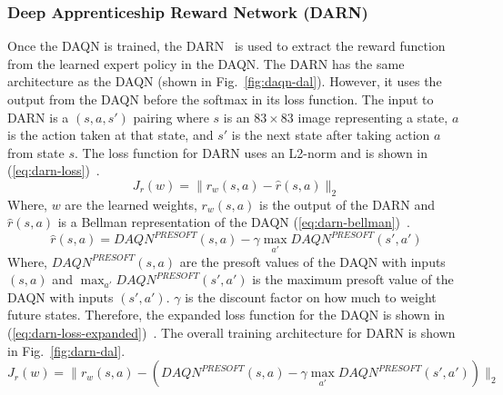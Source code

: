 \documentclass[12pt,american]{report}
\begin{document}
\subsubsection{Deep Apprenticeship Reward Network (DARN)}
Once the DAQN is trained, the DARN~\cite{markovikj2014deep} is used to extract the reward function from the learned expert policy in the DAQN.  The DARN has the same architecture as the DAQN (shown in Fig.~\ref{fig:daqn-dal}). However, it uses the output from the DAQN before the softmax in its loss function.  The input to DARN is a $(s,a,s')$ pairing where $s$ is an $83\times 83$ image representing a state, $a$ is the action taken at that state, and $s'$ is the next state after taking action $a$ from state $s$. The loss function for DARN uses an L2-norm and is shown in (\ref{eq:darn-loss})~\cite{markovikj2014deep}.
\begin{equation}
     \label{eq:darn-loss}
     J_r(w) =\|r_w(s,a) - \hat{r}(s,a) \|_2%
\end{equation}
Where, $w$ are the learned weights, $r_w(s,a)$ is the output of the DARN and $\hat{r}(s,a)$ is a Bellman representation of the DAQN (\ref{eq:darn-bellman})~\cite{markovikj2014deep}.
\begin{equation}
     \label{eq:darn-bellman}
     \hat{r}(s,a) = DAQN^{PRESOFT}(s,a) - \gamma \max_{a'}DAQN^{PRESOFT}(s',a')%
\end{equation}
Where, $DAQN^{PRESOFT}(s,a)$ are the presoft values of the DAQN with inputs $(s,a)$ and $\max_{a'}DAQN^{PRESOFT}(s',a')$ is the maximum presoft value of the DAQN with inputs $(s',a')$. $\gamma$ is the discount factor on how much to weight future states. Therefore, the expanded loss function for the DAQN is shown in (\ref{eq:darn-loss-expanded})~\cite{markovikj2014deep}.  The overall training architecture for DARN is shown in Fig.~\ref{fig:darn-dal}.
\begin{equation}
     \label{eq:darn-loss-expanded}
     J_r(w) =\|r_w(s,a) - (DAQN^{PRESOFT}(s,a) - \gamma \max_{a'}DAQN^{PRESOFT}(s',a'))\|_2%
\end{equation}
\end{document}
